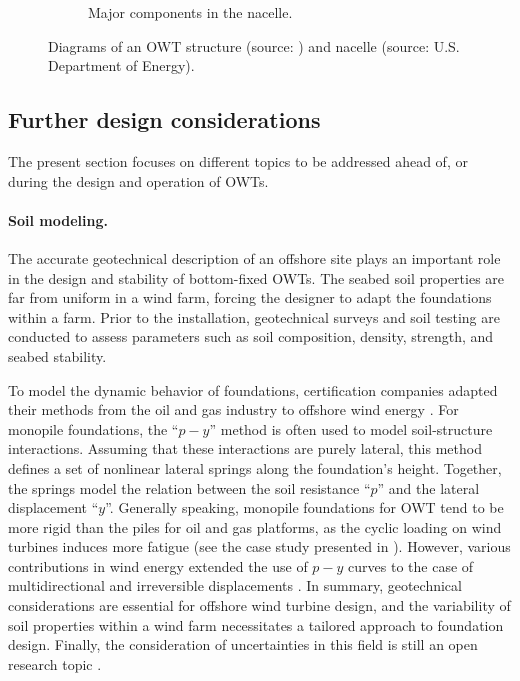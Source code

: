 \begin{figure}
\begin{subfigure}[b]{0.48\textwidth}
        \caption{Major components in the nacelle.}
        \label{fig:nacelle_components}
    \end{subfigure}
    \caption{Diagrams of an OWT structure (source: \citealp{chen_2018_owt_diagram}) and nacelle (source: U.S. Department of Energy).}
    \label{fig:owt_diagram}
\end{figure}

\subsection{Further design considerations}
The present section focuses on different topics to be addressed ahead of, or during the design and operation of OWTs.

\paragraph{Soil modeling.}
The accurate geotechnical description of an offshore site plays an important role in the design and stability of bottom-fixed OWTs. 
The seabed soil properties are far from uniform in a wind farm, forcing the designer to adapt the foundations within a farm. 
Prior to the installation, geotechnical surveys and soil testing are conducted to assess parameters such as soil composition, density, strength, and seabed stability. 

To model the dynamic behavior of foundations, certification companies adapted their methods from the oil and gas industry to offshore wind energy \citep{dnv_2018_soil}. 
For monopile foundations, the ``$p-y$'' method is often used to model soil-structure interactions. 
Assuming that these interactions are purely lateral, this method defines a set of nonlinear lateral springs along the foundation's height.  
Together, the springs model the relation between the soil resistance ``$p$'' and the lateral displacement ``$y$''. 
Generally speaking, monopile foundations for OWT tend to be more rigid than the piles for oil and gas platforms, as the cyclic loading on wind turbines induces more fatigue (see the case study presented in \citet{le_2014_geotech_casestudy}).  
However, various contributions in wind energy extended the use of $p-y$ curves to the case of multidirectional and irreversible displacements \citep{lovera_2019_thesis}. 
In summary, geotechnical considerations are essential for offshore wind turbine design, and the variability of soil properties within a wind farm necessitates a tailored approach to foundation design. 
Finally, the consideration of uncertainties in this field is still an open research topic \citep{reale_2021_OWT_soil_uncertainties}.

